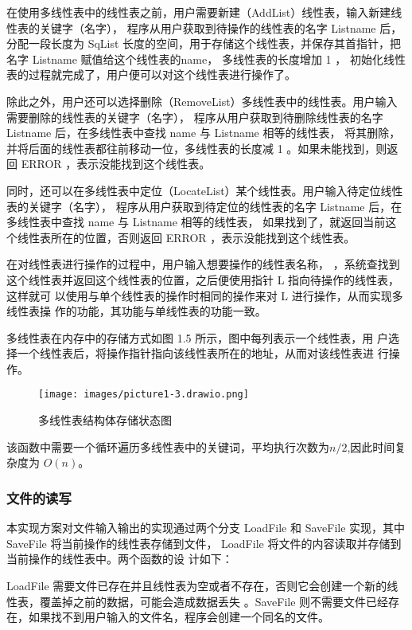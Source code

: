 \documentclass[supercite]{Experimental_Report}
\theoremstyle{definition}
\begin{document}
在使用多线性表中的线性表之前，用户需要新建（AddList）线性表，输入新建线性表的关键字（名字），
程序从用户获取到待操作的线性表的名字 Listname 后，分配一段长度为 SqList
长度的空间，用于存储这个线性表，并保存其首指针，把名字 Listname 赋值给这个线性表的name， 多线性表的长度增加 1 ，
初始化线性表的过程就完成了，用户便可以对这个线性表进行操作了。

除此之外，用户还可以选择删除（RemoveList）多线性表中的线性表。用户输入需要删除的线性表的关键字（名字），
程序从用户获取到待删除线性表的名字 Listname 后，在多线性表中查找 name 与 Listname 相等的线性表，
将其删除，并将后面的线性表都往前移动一位，多线性表的长度减 1 。如果未能找到，则返回 ERROR ，表示没能找到这个线性表。

同时，还可以在多线性表中定位（LocateList）某个线性表。用户输入待定位线性表的关键字（名字），
程序从用户获取到待定位的线性表的名字 Listname 后，在多线性表中查找 name 与 Listname 相等的线性表，
如果找到了，就返回当前这个线性表所在的位置，否则返回 ERROR ，表示没能找到这个线性表。

在对线性表进行操作的过程中，用户输入想要操作的线性表名称，
，系统查找到这个线性表并返回这个线性表的位置，之后便使用指针 L 指向待操作的线性表，这样就可
以使用与单个线性表的操作时相同的操作来对 L 进行操作，从而实现多线性表操
作的功能，其功能与单线性表的功能一致。

多线性表在内存中的存储方式如图 1.5 所示，图中每列表示一个线性表，用
户选择一个线性表后，将操作指针指向该线性表所在的地址，从而对该线性表进
行操作。
\begin{figure}[H]
	\begin{center}
		\texttt{[image: images/picture1-3.drawio.png]}
		\vspace{0.6cm}
		\caption{多线性表结构体存储状态图}
		\label{fig1-5}
	\end{center}
\end{figure}

该函数中需要一个循环遍历多线性表中的关键词，平均执行次数为$n/2$,因此时间复杂度为 $O(n)$。
\subsubsection{文件的读写}
本实现方案对文件输入输出的实现通过两个分支 LoadFile 和
SaveFile 实现，其中 SaveFile 将当前操作的线性表存储到文件，
LoadFile 将文件的内容读取并存储到当前操作的线性表中。两个函数的设
计如下：

LoadFile 需要文件已存在并且线性表为空或者不存在，否则它会创建一个新的线性表，覆盖掉之前的数据，可能会造成数据丢失
。SaveFile 则不需要文件已经存在，如果找不到用户输入的文件名，程序会创建一个同名的文件。
\end{document}
